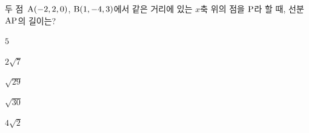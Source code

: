 두 점~$\mathrm{A}(-2{,}\mkern3mu\mathopen{}2{,}\mkern3mu\mathopen{}0)$, $\mathrm{B}(1{,}\mkern3mu\mathopen{}-4{,}\mkern3mu\mathopen{}3)$에서 같은 거리에 있는 $x$축 위의 점을 $\mathrm{P}$라 할 때, 선분~$\mathrm{AP}$의 길이는?
\begin{choices32}{\rule[-3ex]{0pt}{8ex}$5$}{\rule[-3ex]{0pt}{8ex}$2\sqrt{7}$}{\rule[-3ex]{0pt}{8ex}$\sqrt{29}$}{\rule[-3ex]{0pt}{8ex}$\sqrt{30}$}{\rule[-3ex]{0pt}{8ex}$4\sqrt{2}$}\end{choices32}
